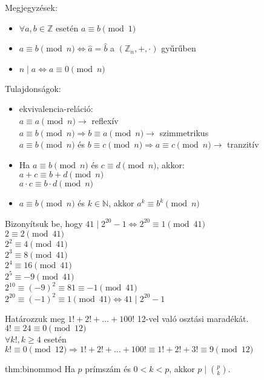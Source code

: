 Megjegyzések: 
\begin{itemize}
	\item $\forall a,b\in\mathbb{Z}$ esetén $a\equiv b\pmod 1$ 
	\item $a\equiv b\pmod n\Leftrightarrow\hat{a}=\hat{b}$ a $(\mathbb{Z}_{n},+,\cdot)$
	gyűrűben 
	\item $n\mid a\Leftrightarrow a\equiv0\pmod n$ 
\end{itemize}
Tulajdonságok: 
\begin{itemize}
	\item ekvivalencia-reláció:\\
	$a\equiv a\pmod n\rightarrow$ reflexív\\
	$a\equiv b\pmod n\Rightarrow b\equiv a\pmod n\rightarrow$ szimmetrikus\\
	$a\equiv b\pmod n$ és $b\equiv c\pmod n\Rightarrow a\equiv c\pmod n\rightarrow$
	tranzitív 
	\item Ha $a\equiv b\pmod n$ és $c\equiv d\pmod n$, akkor:\\
	$a+c\equiv b+d\pmod n$\\
	$a\cdot c\equiv b\cdot d\pmod n$ 
	\item $a\equiv b\pmod n$ és $k\in\mathbb{N}$, akkor $a^{k}\equiv b^{k}\pmod n$ 
\end{itemize}
\begin{example}
	Bizonyítsuk be, hogy $41\mid2^{20}-1\Leftrightarrow2^{20}\equiv1\pmod{41}$\\
	$2\equiv2\pmod{41}$\\
	$2^{2}\equiv4\pmod{41}$\\
	$2^{3}\equiv8\pmod{41}$\\
	$2^{4}\equiv16\pmod{41}$\\
	$2^{5}\equiv-9\pmod{41}$\\
	$2^{10}\equiv(-9)^{2}\equiv81\equiv-1\pmod{41}$\\
	$2^{20}\equiv(-1)^{2}\equiv1\pmod{41}\Leftrightarrow41\mid2^{20}-1$\\
\end{example}
\begin{example}
	Határozzuk meg $1!+2!+\ldots+100!$ 12-vel való osztási maradékát.\\
	$4!\equiv24\equiv0\pmod{12}$\\
	$\forall k!,k\geq4$ esetén $k!\equiv0\pmod{12}\Rightarrow1!+2!+\ldots+100!\equiv1!+2!+3!\equiv9\pmod{12}$
\end{example}
\begin{theorem}{thm:binommod}
	Ha $p$ prímszám és $0<k<p$, akkor $p\mid\binom{p}{k}$. 
\end{theorem}


